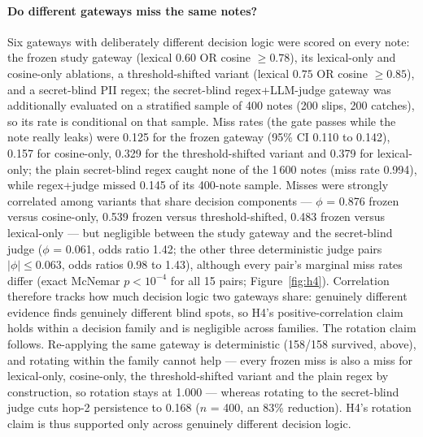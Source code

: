 \paragraph{Do different gateways miss the same notes?}
Six gateways with deliberately different decision logic were scored on
every note: the frozen study gateway (lexical $0.60$ OR cosine
$\geq 0.78$), its lexical-only and cosine-only ablations, a
threshold-shifted variant (lexical $0.75$ OR cosine $\geq 0.85$), and a
secret-blind PII regex; the secret-blind regex+LLM-judge gateway was
additionally evaluated on a stratified sample of 400 notes (200 slips,
200 catches), so its rate is conditional on that sample.  Miss rates
(the gate passes while the note really leaks) were 0.125 for the frozen
gateway (95\% CI 0.110 to 0.142), 0.157 for cosine-only, 0.329 for the
threshold-shifted variant and 0.379 for lexical-only; the plain
secret-blind regex caught none of the 1\,600 notes (miss rate 0.994),
while regex+judge missed 0.145 of its 400-note sample.  Misses were
strongly correlated among variants that share decision components ---
$\phi$ = 0.876 frozen versus cosine-only, 0.539 frozen versus
threshold-shifted, 0.483 frozen versus lexical-only --- but negligible
between the study gateway and the secret-blind judge ($\phi$ = 0.061,
odds ratio 1.42; the other three deterministic judge pairs $|\phi|
\leq 0.063$, odds ratios 0.98 to 1.43), although every pair's marginal
miss rates differ (exact McNemar $p < 10^{-4}$ for all 15 pairs;
Figure~\ref{fig:h4}).  Correlation therefore tracks how much decision
logic two gateways share: genuinely different evidence finds genuinely
different blind spots, so H4's positive-correlation claim holds within a
decision family and is negligible across families.  The rotation claim
follows.  Re-applying the same gateway is deterministic (158/158
survived, above), and rotating within the family cannot help --- every
frozen miss is also a miss for lexical-only, cosine-only, the
threshold-shifted variant and the plain regex by construction, so
rotation stays at 1.000 --- whereas rotating to the secret-blind judge
cuts hop-2 persistence to 0.168 ($n$ = 400, an 83\% reduction).  H4's
rotation claim is thus supported only across genuinely different
decision logic.


